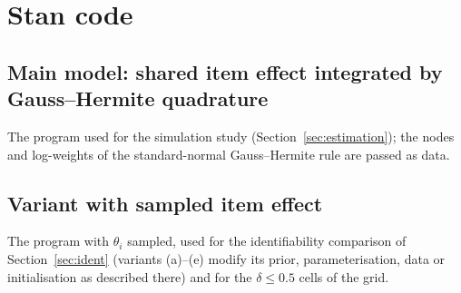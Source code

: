 \section{Stan code}\label{app:stan}
\lstset{showstringspaces=false, breaklines=true, basicstyle=\ttfamily\footnotesize, columns=fullflexible}

\subsection{Main model: shared item effect integrated by Gauss--Hermite quadrature}\label{app:stan_quad}
The program used for the simulation study (Section~\ref{sec:estimation}); the nodes and
log-weights of the standard-normal Gauss--Hermite rule are passed as data.


\subsection{Variant with sampled item effect}\label{app:stan_sampled}
The program with $\theta_i$ sampled, used for the identifiability comparison of
Section~\ref{sec:ident} (variants (a)--(e) modify its prior, parameterisation, data or
initialisation as described there) and for the $\delta \le 0.5$ cells of the grid.

